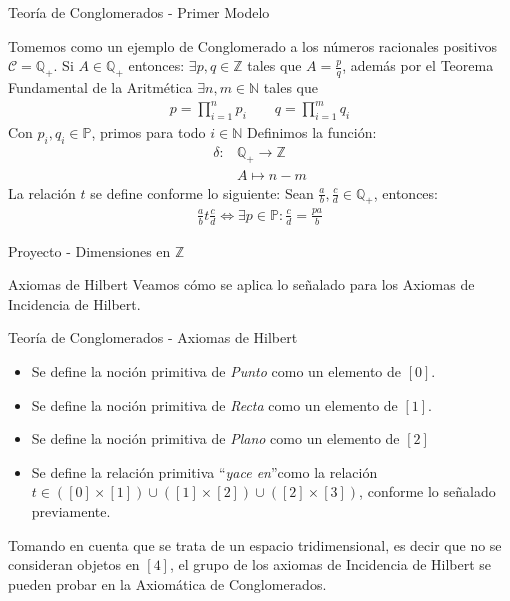 \documentclass{beamer}
\newcommand{\Z}{\mathbb{Z}}
\begin{document}
\begin{frame}{Teoría de Conglomerados - Primer Modelo}

	Tomemos como un ejemplo de Conglomerado a los números racionales positivos $\mathcal{C} = \mathbb{Q}_+$.
	Si $A \in \mathbb{Q}_+$ entonces: $\exists p,q \in \Z$ tales que $A=\frac{p}{q}$, además por el Teorema Fundamental de la Aritmética $\exists n,m \in \mathbb{N}$ tales que
	\begin{align*}
		p=\prod^{n}_{i=1}{p_i} \qquad q=\prod^{m}_{i=1}{q_i}
	\end{align*}
	Con $p_i, q_i \in \mathbb{P}$, primos para todo $i \in \mathbb{N}$
	Definimos la función: 
	\begin{align*}
		\delta:&\mathbb{Q}_+ \longrightarrow \Z\\
		&A \longmapsto n-m		
	\end{align*}
	La relación $t$ se define conforme lo siguiente: Sean $\frac{a}{b}, \frac{c}{d} \in \mathbb{Q}_+$, entonces:
	\begin{align*}
		\frac{a}{b} t \frac{c}{d} \Longleftrightarrow \exists p \in \mathbb{P}: \frac{c}{d} = \frac{pa}{b}
	\end{align*}

\end{frame}

\begin{frame}{Proyecto - Dimensiones en $\mathbb{Z}$}
    \begin{block}{Axiomas de Hilbert}
        Veamos cómo se aplica lo señalado para los Axiomas de Incidencia de Hilbert.
    \end{block}
\end{frame}

\begin{frame}{Teoría de Conglomerados - Axiomas de Hilbert}

\begin{itemize}
	\item Se define la noción primitiva de \textit{Punto} como un elemento de $[0]$.
	\item Se define la noción primitiva de \textit{Recta} como un elemento de $[1]$.
	\item Se define la noción primitiva de \textit{Plano} como un elemento de $[2]$ 
	\item Se define la relación primitiva \textquotedblleft\textit{yace en}\textquotedblright como la relación $t\in ([0] \times [1]) \cup ([1] \times [2]) \cup ([2] \times [3])$, conforme lo señalado previamente.
\end{itemize}
\begin{center}
Tomando en cuenta que se trata de un espacio tridimensional, es decir que no se consideran objetos en $[4]$, el grupo de los axiomas de Incidencia de Hilbert se pueden probar en la Axiomática de Conglomerados.
\end{center}
\end{frame}
\end{document}
